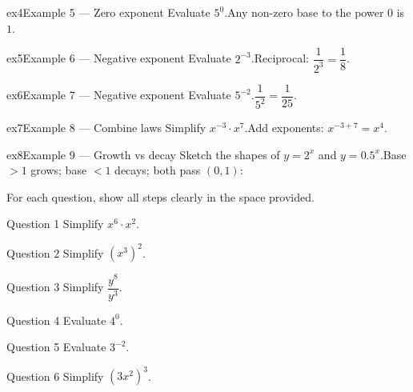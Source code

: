 \documentclass[11pt]{article}
\begin{document}
\begin{example}{ex4}{Example 5 --- Zero exponent}
Evaluate $5^0$.\soln Any non-zero base to the power 0 is $1$.
\end{example}

\begin{example}{ex5}{Example 6 --- Negative exponent}
Evaluate $2^{-3}$.\soln Reciprocal: $\dfrac{1}{2^3}=\dfrac18$.
\end{example}

\begin{example}{ex6}{Example 7 --- Negative exponent}
Evaluate $5^{-2}$.\soln $\dfrac{1}{5^2}=\dfrac{1}{25}$.
\end{example}

\begin{example}{ex7}{Example 8 --- Combine laws}
Simplify $x^{-3}\cdot x^{7}$.\soln Add exponents: $x^{-3+7}=x^4$.
\end{example}

\begin{example}{ex8}{Example 9 --- Growth vs decay}
Sketch the shapes of $y=2^x$ and $y=0.5^x$.\soln Base $>1$ grows; base $<1$ decays; both pass $(0,1)$:
\end{example}

\clearpage
{}
For each question, show all steps clearly in the space provided.

\begin{qbox}{Question 1}
Simplify $x^6\cdot x^2$.\workspace{2.4cm}
\end{qbox}

\begin{qbox}{Question 2}
Simplify $(x^3)^2$.\workspace{2.4cm}
\end{qbox}

\begin{qbox}{Question 3}
Simplify $\dfrac{y^8}{y^3}$.\workspace{2.4cm}
\end{qbox}

\begin{qbox}{Question 4}
Evaluate $4^0$.\workspace{2.4cm}
\end{qbox}

\begin{qbox}{Question 5}
Evaluate $3^{-2}$.\workspace{2.4cm}
\end{qbox}

\begin{qbox}{Question 6}
Simplify $(3x^2)^3$.\workspace{2.4cm}
\end{qbox}
\end{document}

